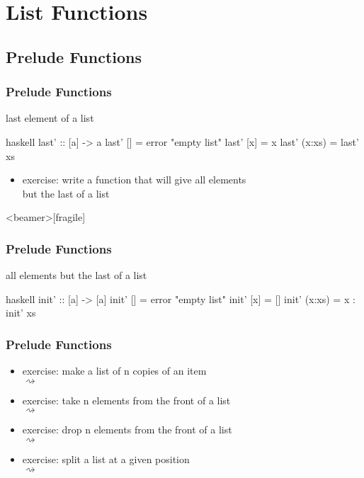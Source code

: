 \documentclass[dvipsnames]{beamer}
\theoremstyle{plain}
\begin{document}
\section{List Functions}

\subsection{Prelude Functions}

\begin{frame}[fragile]
  \frametitle{Prelude Functions}

  \begin{exampleblock}{last element of a list}
    \begin{pygments}{haskell}
last' :: [a] -> a
last' [] = error "empty list"
last' [x] = x
last' (x:xs) = last' xs
    \end{pygments}
  \end{exampleblock}

  \pause
  \begin{itemize}
    \item exercise: write a function that will give all elements\\
      but the last of a list
  \end{itemize}
\end{frame}

\begin{frame}<beamer>[fragile]
  \frametitle{Prelude Functions}

  \begin{exampleblock}{all elements but the last of a list}
    \begin{pygments}{haskell}
init' :: [a] -> [a]
init' [] = error "empty list"
init' [x] = []
init' (x:xs) = x : init' xs
    \end{pygments}
  \end{exampleblock}
\end{frame}

\begin{frame}
  \frametitle{Prelude Functions}

  \begin{itemize}
    \item exercise: make a list of n copies of an item\\
       $\rightsquigarrow$
    \item exercise: take n elements from the front of a list\\
       $\rightsquigarrow$
    \item exercise: drop n elements from the front of a list\\
       $\rightsquigarrow$
    \item exercise: split a list at a given position\\
       $\rightsquigarrow$
  \end{itemize}
\end{frame}
\end{document}
